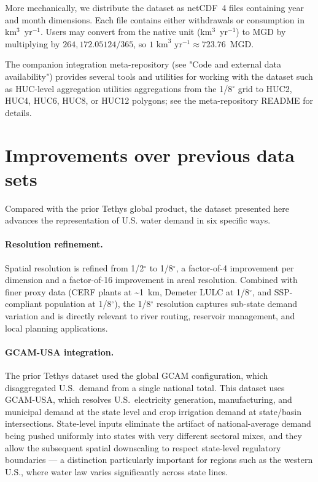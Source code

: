 \documentclass[fleqn,10pt]{wlscirep}
\begin{document}
More mechanically, we distribute the dataset as netCDF~4 files containing year and month dimensions. Each file contains either withdrawals or consumption in km$^3$~yr$^{-1}$. Users may convert from the native unit (km$^3$~yr$^{-1}$) to MGD by multiplying by $264{,}172.05124/365$, so $1\text{ km}^3\text{ yr}^{-1} \approx 723.76$~MGD.

The companion integration meta-repository (see "Code and external data availability") provides several tools and utilities for working with the dataset such as HUC-level aggregation utilities aggregations from the 1/8$^{\circ}$ grid to HUC2, HUC4, HUC6, HUC8, or HUC12 polygons; see the meta-repository README for details.

\section*{Improvements over previous data sets} \label{sec:improvements}

Compared with the prior Tethys global product\cite{Khan2023}, the dataset presented here advances the representation of U.S. water demand in six specific ways.

\paragraph{Resolution refinement.} Spatial resolution is refined from 1/2$^{\circ}$ to 1/8$^{\circ}$, a factor-of-4 improvement per dimension and a factor-of-16 improvement in areal resolution. Combined with finer proxy data (CERF plants at \textasciitilde1~km, Demeter LULC at 1/8$^{\circ}$, and SSP-compliant population at 1/8$^{\circ}$), the 1/8$^{\circ}$ resolution captures sub-state demand variation and is directly relevant to river routing, reservoir management, and local planning applications.

\paragraph{GCAM-USA integration.} The prior Tethys dataset used the global GCAM configuration, which disaggregated U.S.~demand from a single national total. This dataset uses GCAM-USA, which resolves U.S.~electricity generation, manufacturing, and municipal demand at the state level and crop irrigation demand at state/basin intersections. State-level inputs eliminate the artifact of national-average demand being pushed uniformly into states with very different sectoral mixes, and they allow the subsequent spatial downscaling to respect state-level regulatory boundaries — a distinction particularly important for regions such as the western U.S., where water law varies significantly across state lines.
\end{document}
